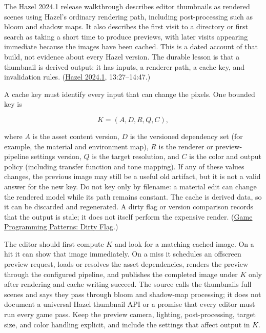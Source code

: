 \hypertarget{06-engine-ii-ch041-a-thumbnail-cache-is-derived-render-output-with-explicit-invalidation}{}

The Hazel 2024.1 release walkthrough describes editor thumbnails as rendered scenes using Hazel's ordinary rendering path, including post-processing such as bloom and shadow maps. It also describes the first visit to a directory or first search as taking a short time to produce previews, with later visits appearing immediate because the images have been cached. This is a dated account of that build, not evidence about every Hazel version. The durable lesson is that a thumbnail is derived output: it has inputs, a renderer path, a cache key, and invalidation rules. (\href{https://www.youtube.com/watch?v=10OVd1VHEZ4&t=13m27s}{Hazel 2024.1}, 13:27--14:47.)

A cache key must identify every input that can change the pixels. One bounded key is

\[
K=(A,D,R,Q,C),
\]

where \(A\) is the asset content version, \(D\) is the versioned dependency set (for example, the material and environment map), \(R\) is the renderer or preview-pipeline settings version, \(Q\) is the target resolution, and \(C\) is the color and output policy (including transfer function and tone mapping). If any of these values changes, the previous image may still be a useful old artifact, but it is not a valid answer for the new key. Do not key only by filename: a material edit can change the rendered model while its path remains constant. The cache is derived data, so it can be discarded and regenerated. A dirty flag or version comparison records that the output is stale; it does not itself perform the expensive render. (\href{https://github.com/munificent/game-programming-patterns/blob/master/book/dirty-flag.markdown}{Game Programming Patterns: Dirty Flag}.)

The editor should first compute \(K\) and look for a matching cached image. On a hit it can show that image immediately. On a miss it schedules an offscreen preview request, loads or resolves the asset dependencies, renders the preview through the configured pipeline, and publishes the completed image under \(K\) only after rendering and cache writing succeed. The source calls the thumbnails full scenes and says they pass through bloom and shadow-map processing; it does not document a universal Hazel thumbnail API or a promise that every editor must run every game pass. Keep the preview camera, lighting, post-processing, target size, and color handling explicit, and include the settings that affect output in \(K\).

